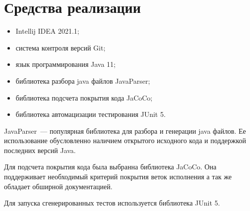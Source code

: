\section{Средства реализации} \label{sub22}


\begin{itemize} 
\item{Intellij IDEA 2021.1;}	
\item{система контроля версий Git;}
\item{язык программирования Java 11;}
\item{библиотека разбора java файлов JavaParser;}
\item{библиотека подсчета покрытия кода JaCoCo;}
\item{библиотека автомацизации тестирования JUnit 5.}
\end{itemize}

JavaParser~--- популярная библиотека для разбора и генерации java файлов. Ее использование обусловленно наличием открытого исходного кода и поддержкой последних версий Java. 

Для подсчета покрытия кода была выбранна библиотека JaCoCo. Она поддерживает необходимый критерий покрытия веток исполнения а так же обладает обширной документацией.

Для запуска сгенерированных тестов используется библиотека JUnit 5. 